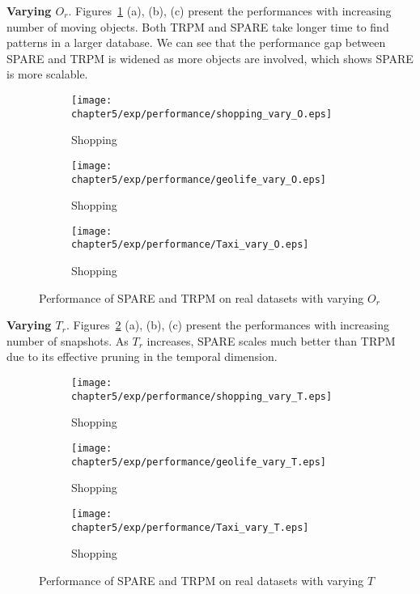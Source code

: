 \textbf{Varying $O_r$}. Figures~\ref{exp:performance_vary_o} (a), (b), (c) present the performances with increasing number of moving objects. Both TRPM and SPARE take longer time to find patterns in a larger database. We can see that the performance gap between SPARE and TRPM is widened as more objects are involved, which shows SPARE is more scalable.

\begin{figure}[h]
\centering
    \begin{subfigure}[b]{0.3\textwidth}
        \texttt{[image: chapter5/exp/performance/shopping\_vary\_O.eps]}
	     \caption{Shopping}	
    \end{subfigure}
    \begin{subfigure}[b]{0.3\textwidth}
        \texttt{[image: chapter5/exp/performance/geolife\_vary\_O.eps]}
	     \caption{Shopping}	
    \end{subfigure}
    \begin{subfigure}[b]{0.3\textwidth}
        \texttt{[image: chapter5/exp/performance/Taxi\_vary\_O.eps]}
	     \caption{Shopping}	
    \end{subfigure}
\caption{Performance of SPARE and TRPM on real datasets with varying $O_r$}
\label{exp:performance_vary_o}
\end{figure}


\textbf{Varying $T_r$}. Figures~\ref{exp:performance_vary_t} (a), (b), (c) present 
the performances with increasing number of snapshots. As $T_r$ increases, SPARE scales much better than TRPM due to its effective pruning in the temporal dimension. 

\begin{figure}[h]
\centering
    \begin{subfigure}[b]{0.3\textwidth}
        \texttt{[image: chapter5/exp/performance/shopping\_vary\_T.eps]}
	     \caption{Shopping}	
    \end{subfigure}
    \begin{subfigure}[b]{0.3\textwidth}
        \texttt{[image: chapter5/exp/performance/geolife\_vary\_T.eps]}
	     \caption{Shopping}	
    \end{subfigure}
    \begin{subfigure}[b]{0.3\textwidth}
        \texttt{[image: chapter5/exp/performance/Taxi\_vary\_T.eps]}
	     \caption{Shopping}	
    \end{subfigure}
\caption{Performance of SPARE and TRPM on real datasets with varying $T$}
\label{exp:performance_vary_t}
\end{figure}


